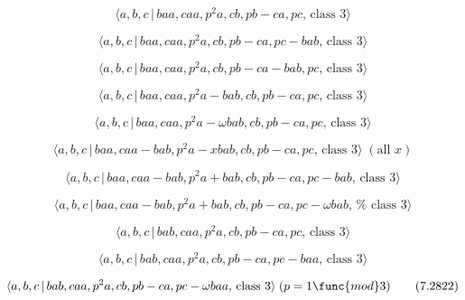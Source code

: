 \documentclass[10pt]{article}
\begin{document}
\begin{equation}
\langle a,b,c\,|\,baa,caa,p^2a,cb,pb-ca,pc,\,\text{class }3\rangle 
\tag{7.2812}
\end{equation}

\begin{equation}
\langle a,b,c\,|\,baa,caa,p^2a,cb,pb-ca,pc-bab,\,\text{class }3\rangle 
\tag{7.2813}
\end{equation}

\begin{equation}
\langle a,b,c\,|\,baa,caa,p^2a,cb,pb-ca-bab,pc,\,\text{class }3\rangle 
\tag{7.2814}
\end{equation}

\begin{equation}
\langle a,b,c\,|\,baa,caa,p^2a-bab,cb,pb-ca,pc,\,\text{class }3\rangle 
\tag{7.2815}
\end{equation}

\begin{equation}
\langle a,b,c\,|\,baa,caa,p^{2}a-\omega bab,cb,pb-ca,pc,\,\text{class }%
3\rangle  \tag{7.2816}
\end{equation}

\begin{equation}
\langle a,b,c\,|\,baa,caa-bab,p^2a-xbab,cb,pb-ca,pc,\,\text{class }3\rangle
\;(\text{all }x)  \tag{7.2817}
\end{equation}

\begin{equation}
\langle a,b,c\,|\,baa,caa-bab,p^2a+bab,cb,pb-ca,pc-bab,\,\text{class }%
3\rangle  \tag{7.2818}
\end{equation}

\begin{equation}
\langle a,b,c\,|\,baa,caa-bab,p^{2}a+bab,cb,pb-ca,pc-\omega bab,\,\text{%
class }3\rangle  \tag{7.2819}
\end{equation}

\begin{equation}
\langle a,b,c\,|\,bab,caa,p^2a,cb,pb-ca,pc,\,\text{class }3\rangle 
\tag{7.2820}
\end{equation}

\begin{equation}
\langle a,b,c\,|\,bab,caa,p^2a,cb,pb-ca,pc-baa,\,\text{class }3\rangle 
\tag{7.2821}
\end{equation}

\begin{equation}
\langle a,b,c\,|\,bab,caa,p^{2}a,cb,pb-ca,pc-\omega baa,\,\text{class }%
3\rangle \;(p=1\func{mod}3)  \tag{7.2822}
\end{equation}
\end{document}
